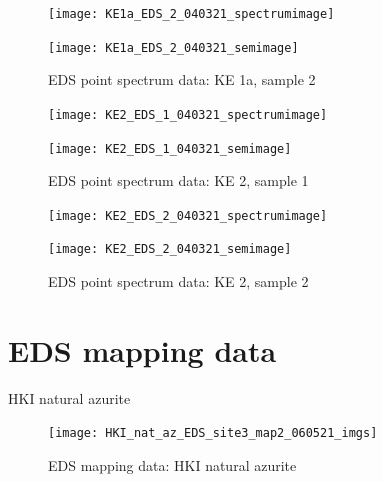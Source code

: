 \begin{figure}[H]
\centering
\begin{minipage}{.45\textwidth}
  \centering
  \texttt{[image: KE1a\_EDS\_2\_040321\_spectrumimage]}
\end{minipage}
\begin{minipage}{.45\textwidth}
  \centering
  \texttt{[image: KE1a\_EDS\_2\_040321\_semimage]}
\end{minipage}
\caption[EDS point spectrum data: KE 1a, sample 2]{EDS point spectrum data: KE 1a, sample 2}
\label{fig:ke1a_point_eds_2}
\end{figure}



\begin{figure}[H]
\centering
\begin{minipage}{.45\textwidth}
  \centering
  \texttt{[image: KE2\_EDS\_1\_040321\_spectrumimage]}
\end{minipage}
\begin{minipage}{.45\textwidth}
  \centering
  \texttt{[image: KE2\_EDS\_1\_040321\_semimage]}
\end{minipage}
\caption[EDS point spectrum data: KE 2, sample 1]{EDS point spectrum data: KE 2, sample 1}
\label{fig:ke2_point_eds_1}
\end{figure}

\begin{figure}[H]
\centering
\begin{minipage}{.45\textwidth}
  \centering
  \texttt{[image: KE2\_EDS\_2\_040321\_spectrumimage]}
\end{minipage}
\begin{minipage}{.45\textwidth}
  \centering
  \texttt{[image: KE2\_EDS\_2\_040321\_semimage]}
\end{minipage}
\caption[EDS point spectrum data: KE 2, sample 2]{EDS point spectrum data: KE 2, sample 2}
\label{fig:ke2_point_eds_2}
\end{figure}

\chapter{EDS mapping data}

HKI natural azurite

\begin{figure}[H]
\centering
  \texttt{[image: HKI\_nat\_az\_EDS\_site3\_map2\_060521\_imgs]}
\caption[EDS mapping data: HKI natural azurite]{EDS mapping data: HKI natural azurite}
\label{fig:hki_map2}
\end{figure}


